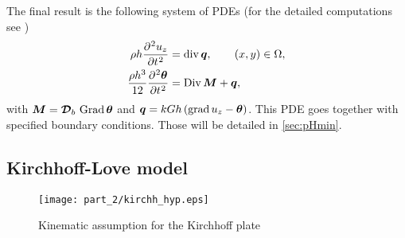 The final result is the following system of PDEs (for the detailed computations see \cite[Chapter 10]{reddy2006theory})
\begin{equation}\label{eq:classMin}
\begin{aligned}
\rho h \diffp[2]{u_z}{t} &= \div \bm{q}, \qquad (x,y) \in \Omega, \\
\frac{\rho h^3}{12} \diffp[2]{\bm{\theta}}{t} &=\Div \bm{M} + \bm{q},
\end{aligned}
\end{equation}
with $\bm{M}= \bm{\mathcal{D}}_b\,\operatorname*{Grad}{\bm{\theta}}$ and $\bm{q}= kGh\,(\operatorname*{grad} u_z - \bm{\theta})$. This PDE goes together with specified boundary conditions. Those will be detailed in \ref{sec:pHmin}.


\subsection{Kirchhoff-Love model}
\begin{figure}[tb]
	\centering
	\texttt{[image: part\_2/kirchh\_hyp.eps]}
	\caption{Kinematic assumption for the Kirchhoff plate}
	\label{fig:kirchh_hyp}
\end{figure}

